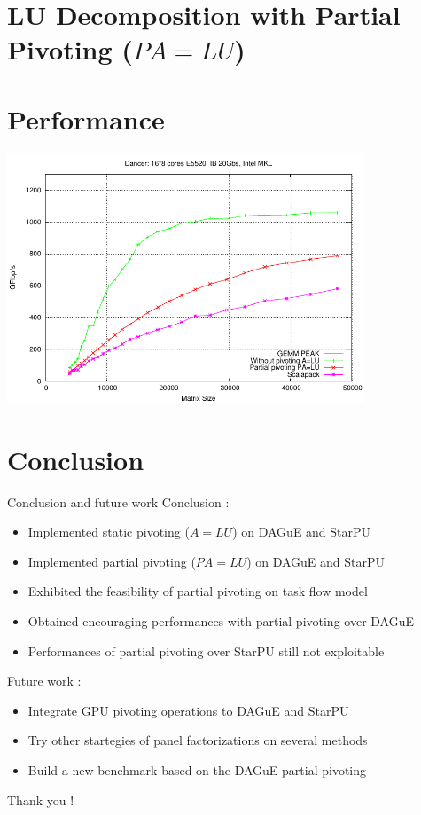 \documentclass{beamer}
\begin{document}
\section[Partial Pivoting]{LU Decomposition with Partial Pivoting ($PA=LU$)}


\section{Performance}
\begin{frame}
\begin{center}
\includegraphics[width=0.8\textwidth]{gepp}
\end{center}
\end{frame}

\section*{Conclusion}
\begin{frame}{Conclusion and future work}
Conclusion :
\begin{itemize}
\item Implemented static pivoting ($A=LU$) on DAGuE and StarPU
\item Implemented partial pivoting ($PA=LU$) on DAGuE and StarPU
\item Exhibited the feasibility of partial pivoting on task flow model
\item Obtained encouraging performances with partial pivoting over DAGuE
\item Performances of partial pivoting over StarPU still not exploitable
\end{itemize}
Future work :
\begin{itemize}
\item Integrate GPU pivoting operations to DAGuE and StarPU
\item Try other startegies of panel factorizations on several methods
\item Build a new benchmark based on the DAGuE partial pivoting
\end{itemize}
\end{frame}

\begin{frame}
\begin{center}
\huge{Thank you !}
\end{center}
\end{frame}


\end{document}

